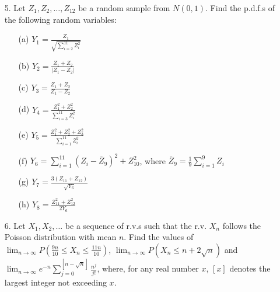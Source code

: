 \documentclass[11pt]{article}
\begin{document}
\begin{enumerate}
    \item[5.] Let $Z_1, Z_2, \dots, Z_{12}$ be a random sample from $N(0,1)$. Find the p.d.f.s of the following random variables:
    \begin{enumerate}
        \item[(a)] $Y_1 = \frac{Z_1}{\sqrt{\sum_{i=2}^{11} Z_i^2}}$
        \item[(b)] $Y_2 = \frac{Z_1 + Z_2}{\lvert Z_1 - Z_2 \rvert}$
        \item[(c)] $Y_3 = \frac{Z_1 + Z_2}{Z_1 - Z_2}$
        \item[(d)] $Y_4 = \frac{Z_1^2 + Z_2^2}{\sum_{i=3}^{11} Z_i^2}$
        \item[(e)] $Y_5 = \frac{Z_1^2 + Z_2^2 + Z_3^2}{\sum_{i=1}^{11} Z_i^2}$
        \item[(f)] $Y_6 = \sum_{i=1}^{11} (Z_i - \overline{Z}_9)^2 + Z_{10}^2$, 
        where $\overline{Z}_9 = \frac{1}{9}\sum_{i=1}^{9} Z_i$
        \item[(g)] $Y_7 = \frac{3(Z_{11} + Z_{12})}{\sqrt{Y_6}}$
        \item[(h)] $Y_8 = \frac{Z_{11}^2 + Z_{12}^2}{2Y_6}$
    \end{enumerate}
\end{enumerate}

\begin{enumerate}
    \item[6.] Let $X_1, X_2, \dots$ be a sequence of r.v.s such that the r.v. $X_n$ follows the Poisson distribution with mean $n$. Find the values of $\lim_{n \to \infty} P(\frac{9n}{10} \le X_n \le \frac{11n}{10})$, $\lim_{n \to \infty} P(X_n \le n + 2\sqrt{n})$ and $\lim_{n \to \infty} e^{-n} \sum_{j=0}^{[n-\sqrt{n}]} \frac{n^j}{j!}$, where, for any real number $x$, $[x]$ denotes the largest integer not exceeding $x$.
\end{enumerate}
\end{document}
